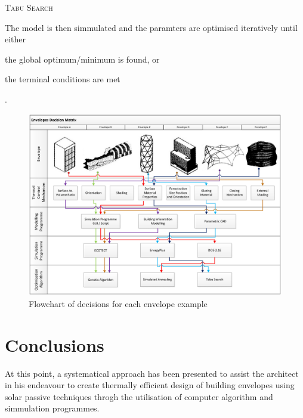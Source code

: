 \begin{compactenum}
\item \textsc{Tabu Search}
\end{compactenum}

The model is then simmulated and the paramters are optimised iteratively until either \begin{inparaenum}[a)]\item the global optimum/minimum is found, or \item the terminal conditions are met\end{inparaenum}.


\begin{figure}
	\centering
	\includegraphics[width=19cm]{./Images/24-DecisionChart}
	\caption[Decision Flowchart]{Flowchart of decisions for each envelope example}
	\label{fig:DecisionChart}
\end{figure}

\clearpage
\section{Conclusions}

At this point, a systematical approach has been presented to assist the architect in his endeavour to create thermally efficient design of building envelopes using solar passive techniques throgh the utilisation of computer algorithm and simmulation programmes.

